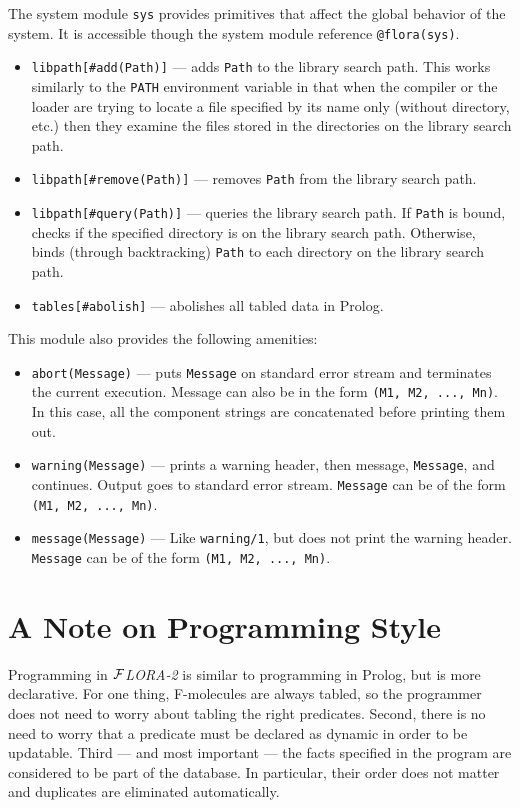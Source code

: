 \documentclass[11pt]{article}
\newcommand{\FLORA}{{\mbox{${\cal F}${\small\it LORA}\rm\emph{-2}}}\xspace}
\begin{document}
The system module {\tt sys} provides primitives that affect the global
behavior of the system. It is accessible though the system module reference
{\tt @flora(sys)}.
\begin{itemize}
  \item  {\tt libpath[\#add(Path)]} --- adds {\tt Path} to the library
    search path. This works similarly to the {\tt PATH} environment
    variable in that when the compiler or the loader are trying to locate a
    file specified by its name only (without directory, etc.) then they
    examine the files stored in the directories on the library search path.
  \item {\tt libpath[\#remove(Path)]} --- removes {\tt Path} from the
    library search path.
  \item {\tt libpath[\#query(Path)]} --- queries the library search path. If
    {\tt Path} is bound, checks if the specified directory is on the
    library search path. Otherwise, binds (through backtracking) {\tt Path}
    to each directory on the library search path.
  \item {\tt tables[\#abolish]} --- abolishes all tabled data in Prolog.
\end{itemize}
This module also provides the following amenities:
\begin{itemize}
  \item  {\tt abort(Message)} --- puts {\tt Message} on standard error
  stream and terminates the current execution. Message can also be in the
  form {\tt (M1, M2, ..., Mn)}. In this case, all the component strings are
  concatenated before printing them out.
\item {\tt warning(Message)} --- prints a warning header, then message,
  {\tt Message}, and continues. Output goes to standard error
  stream. {\tt Message} can be of the form {\tt (M1, M2, ..., Mn)}.
\item {\tt message(Message)} --- Like {\tt warning/1}, but does not print
  the warning header. {\tt Message} can be of the form {\tt (M1, M2, ..., Mn)}.
\end{itemize}


\section{A Note on Programming Style}

Programming in \FLORA is similar to programming in Prolog, but is more
declarative. For one thing, F-molecules are always tabled, so the
programmer does not need to worry about tabling the right predicates.
Second, there is no need to worry that a predicate must be declared as
dynamic in order to be updatable. Third --- and most important --- the facts 
specified in the program are considered to be part of the database. In
particular, their order does not matter and duplicates are eliminated
automatically. 
\end{document}
